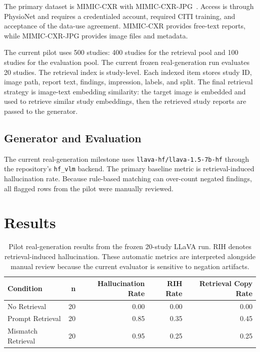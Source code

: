 \documentclass[11pt]{article}
\begin{document}
The primary dataset is MIMIC-CXR with MIMIC-CXR-JPG~\cite{johnson2019mimiccxr}. Access is through PhysioNet and requires a credentialed account, required CITI training, and acceptance of the data-use agreement. MIMIC-CXR provides free-text reports, while MIMIC-CXR-JPG provides image files and metadata.

The current pilot uses 500 studies: 400 studies for the retrieval pool and 100 studies for the evaluation pool. The current frozen real-generation run evaluates 20 studies. The retrieval index is study-level. Each indexed item stores study ID, image path, report text, findings, impression, labels, and split. The final retrieval strategy is image-text embedding similarity: the target image is embedded and used to retrieve similar study embeddings, then the retrieved study reports are passed to the generator.

\subsection{Generator and Evaluation}

The current real-generation milestone uses \texttt{llava-hf/llava-1.5-7b-hf} through the repository's \texttt{hf\_vlm} backend. The primary baseline metric is retrieval-induced hallucination rate. Because rule-based matching can over-count negated findings, all flagged rows from the pilot were manually reviewed.

\section{Results}

\begin{table}[h]
\centering
\begin{tabular}{lrrrr}
\toprule
Condition & n & Hallucination Rate & RIH Rate & Retrieval Copy Rate \\
\midrule
No Retrieval & 20 & 0.00 & 0.00 & 0.00 \\
Prompt Retrieval & 20 & 0.85 & 0.35 & 0.45 \\
Mismatch Retrieval & 20 & 0.95 & 0.25 & 0.25 \\
\bottomrule
\end{tabular}
\caption{Pilot real-generation results from the frozen 20-study LLaVA run. RIH denotes retrieval-induced hallucination. These automatic metrics are interpreted alongside manual review because the current evaluator is sensitive to negation artifacts.}
\label{tab:pilot-results}
\end{table}
\end{document}
